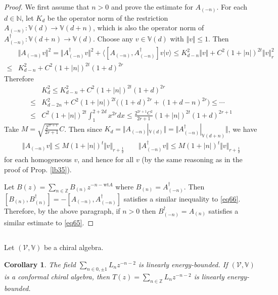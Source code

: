 \documentclass[12pt,b5paper,notitlepage]{article}
\theoremstyle{definition}
\theoremstyle{plain}
\newtheorem{co}[df]{Corollary}
\newcommand{\mc}{\mathcal}
\newcommand{\bk}[1]{\langle {#1}\rangle}
\newcommand{\Vbb}{\mathbb V}
\newcommand{\Nbb}{\mathbb N}
\newcommand{\Zbb}{\mathbb Z}
\newcommand{\wt}{\mathrm{wt}}
\numberwithin{equation}{section}
\begin{document}
\begin{proof}
We first assume that $n>0$ and prove the estimate for $A_{(-n)}$. For each $d\in\Nbb$, let $K_d$ be the operator norm of the restriction $A_{(-n)}:\Vbb(d)\rightarrow\Vbb(d+n)$, which is also the operator norm of $A_{(-n)}^\dagger:\Vbb(d+n)\rightarrow\Vbb(d)$. Choose any $v\in\Vbb(d)$ with $\Vert v\Vert\leq 1$. Then
\begin{align*}
&\Vert A_{(-n)}v\Vert^2=\Vert A_{(-n)}^\dagger v\Vert^2+\bk{[A_{(-n)},A_{(-n)}^\dagger]v|v}\leq K_{d-n}^2\Vert v\Vert+C^2(1+|n|)^{2t}\Vert v\Vert_r^2\\
\leq& K_{d-n}^2+C^2(1+|n|)^{2t}(1+d)^{2r}
\end{align*}
Therefore
\begin{align*}
&K_d^2\leq K_{d-n}^2+C^2(1+|n|)^{2t}(1+d)^{2r}\\
\leq& K_{d-2n}^2+C^2(1+|n|)^{2t}\big((1+d)^{2r}+(1+d-n)^{2r}\big)\leq\cdots\\
\leq& C^2(1+|n|)^{2t}\int_1^{2+2d}x^{2r}dx\leq \frac{2^{2r+1}C^2}{2r+1}(1+|n|)^{2t}(1+d)^{2r+1}
\end{align*}
Take $M=\sqrt{\frac{2^{2r+1}}{2r+1}}C$. Then since $K_d=\Vert A_{(-n)}|_{\Vbb(d)}\Vert=\Vert A_{(-n)}^\dagger|_{\Vbb(d+n)}\Vert$, we have
\begin{align*}
\Vert A_{(-n)}v\Vert \leq M(1+|n|)^t\Vert v\Vert_{r+\frac 12}\qquad \Vert A_{(-n)}^\dagger v\Vert \leq M(1+|n|)^t\Vert v\Vert_{r+\frac 12}
\end{align*}
for each homogeneous $v$, and hence for all $v$ (by the same reasoning as in the proof of Prop. \ref{lb35}).

Let $B(z)=\sum_{n\in\Zbb}B_{(n)}z^{-n-\wt A}$ where $B_{(n)}=A_{(-n)}^\dagger$. Then $[B_{(n)},B_{(n)}^\dagger]=-[A_{(-n)},A_{(-n)}^\dagger]$ satisfies a similar inequality to \eqref{eq66}. Therefore, by the above paragraph, if $n>0$ then $B_{(-n)}^\dagger=A_{(n)}$ satisfies a similar estimate to \eqref{eq65}.
\end{proof}




\subsection{}

Let $(\mc V,\Vbb)$ be a chiral algebra. 

\begin{co}\label{lb43}
The field $\sum_{n\in 0,\pm1}L_nz^{-n-2}$ is linearly energy-bounded. If $(\mc V,\Vbb)$ is a conformal chiral algebra, then $T(z)=\sum_{n\in\Zbb}L_nz^{-n-2}$ is linearly energy-bounded.
\end{co}
\end{document}
